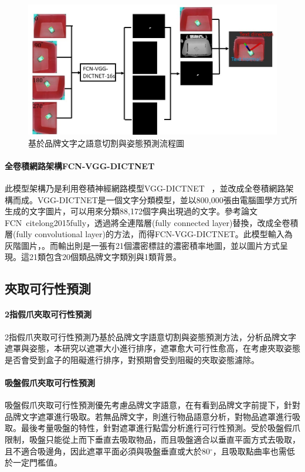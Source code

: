 \begin{figure}[ht]
	\centering
	\includegraphics[height=!, width=1.0\linewidth, keepaspectratio=true]
	{./figures/text-pose-extimation-pipeline.jpg}
  \caption{基於品牌文字之語意切割與姿態預測流程圖}
  \label{figure:text-pose-extimation-pipeline}
\end{figure}

\paragraph{全卷積網路架構FCN-VGG-DICTNET}
此模型架構乃是利用卷積神經網路模型VGG-DICTNET ~\cite{jaderberg2014synthetic}，並改成全卷積網路架構而成。VGG-DICTNET是一個文字分類模型，並以800,000張由電腦圖學方式所生成的文字圖片，可以用來分類88,172個字典出現過的文字。參考論文FCN~cite{long2015fully}，透過將全連階層(fully connected layer)替換，改成全卷積層(fully convolutional layer)的方法，而得FCN-VGG-DICTNET。此模型輸入為灰階圖片，。而輸出則是一張有21個濃密標註的濃密積率地圖，並以圖片方式呈現。這21類包含20個類品牌文字類別與1類背景。

\subsection{夾取可行性預測}
\paragraph{2指假爪夾取可行性預測}
2指假爪夾取可行性預測乃基於品牌文字語意切割與姿態預測方法，分析品牌文字遮罩與姿態，本研究以遮罩大小進行排序，遮罩愈大可行性愈高，在考慮夾取姿態是否會受到盒子的阻礙進行排序，對預期會受到阻礙的夾取姿態濾除。


\paragraph{吸盤假爪夾取可行性預測}
吸盤假爪夾取可行性預測優先考慮品牌文字語意，在有看到品牌文字前提下，針對品牌文字遮罩進行吸取。若無品牌文字，則進行物品語意分析，對物品遮罩進行吸取。最後考量吸盤的特性，針對遮罩進行點雲分析進行可行性預測。受於吸盤假爪限制，吸盤只能從上而下垂直去吸取物品，而且吸盤適合以垂直平面方式去吸取，且不適合吸邊角，因此遮罩平面必須與吸盤垂直或大於80$^{\circ}$，且吸取點曲率也需低於一定門檻值。




